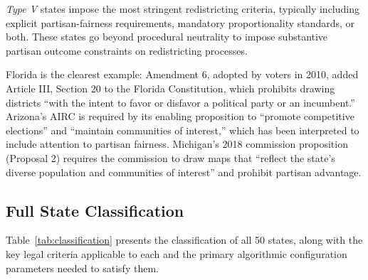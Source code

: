 \textit{Type V} states impose the most stringent redistricting criteria, typically including explicit partisan-fairness requirements, mandatory proportionality standards, or both. These states go beyond procedural neutrality to impose substantive partisan outcome constraints on redistricting processes.

Florida is the clearest example: Amendment 6, adopted by voters in 2010, added Article III, Section 20 to the Florida Constitution, which prohibits drawing districts ``with the intent to favor or disfavor a political party or an incumbent.'' Arizona's AIRC is required by its enabling proposition to ``promote competitive elections'' and ``maintain communities of interest,'' which has been interpreted to include attention to partisan fairness. Michigan's 2018 commission proposition (Proposal 2) requires the commission to draw maps that ``reflect the state's diverse population and communities of interest'' and prohibit partisan advantage.

\subsection{Full State Classification}

Table~\ref{tab:classification} presents the classification of all 50 states, along with the key legal criteria applicable to each and the primary algorithmic configuration parameters needed to satisfy them.

